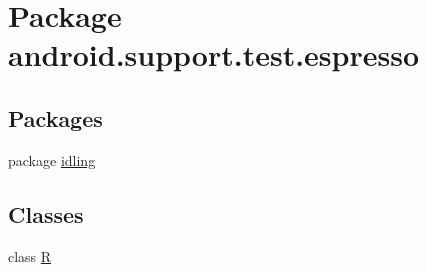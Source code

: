 \hypertarget{namespaceandroid_1_1support_1_1test_1_1espresso}{}\section{Package android.\+support.\+test.\+espresso}
\label{namespaceandroid_1_1support_1_1test_1_1espresso}
\subsection*{Packages}
\begin{DoxyCompactItemize}
\item 
package \mbox{\hyperlink{namespaceandroid_1_1support_1_1test_1_1espresso_1_1idling}{idling}}
\end{DoxyCompactItemize}
\subsection*{Classes}
\begin{DoxyCompactItemize}
\item 
class \mbox{\hyperlink{classandroid_1_1support_1_1test_1_1espresso_1_1R}{R}}
\end{DoxyCompactItemize}
